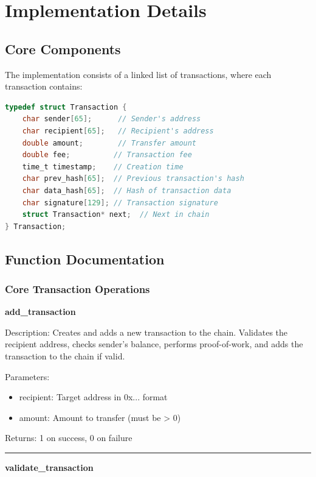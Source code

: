 \documentclass[12pt]{article}
\begin{document}
\newpage
\section{Implementation Details}

\subsection{Core Components}
The implementation consists of a linked list of transactions, where each transaction contains:

\begin{lstlisting}[language=C]
typedef struct Transaction {
    char sender[65];      // Sender's address
    char recipient[65];   // Recipient's address  
    double amount;        // Transfer amount
    double fee;          // Transaction fee
    time_t timestamp;    // Creation time
    char prev_hash[65];  // Previous transaction's hash
    char data_hash[65];  // Hash of transaction data
    char signature[129]; // Transaction signature
    struct Transaction* next;  // Next in chain
} Transaction;
\end{lstlisting}

\subsection{Function Documentation}

\subsubsection{Core Transaction Operations}
\textbf{add\_transaction}

Description: Creates and adds a new transaction to the chain. Validates the recipient address, checks sender's balance, performs proof-of-work, and adds the transaction to the chain if valid.

Parameters:
\begin{itemize}
\item recipient: Target address in 0x... format
\item amount: Amount to transfer (must be > 0)
\end{itemize}

Returns: 1 on success, 0 on failure

\vspace{1em}
\hrule
\vspace{1em}

\textbf{validate\_transaction}
\end{document}
